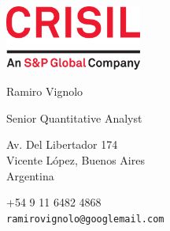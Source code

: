 \documentclass{article}
\begin{document}
\AddToShipoutPicture{\BackgroundPic}


\vspace{0.5cm plus \chico minus \chico}

\begin{minipage}{0.3\linewidth}




\end{minipage}
\begin{minipage}{0.4\linewidth}

\begin{center}
\href{http://www.crisil.com}{\includegraphics[width=4.5cm]{logos/crisil}}\\

\smallskip

\textsf{Ramiro Vignolo}
\par
\textsf{Senior Quantitative Analyst}\\

\medskip

Av. Del Libertador 174\\
Vicente López, Buenos Aires\\
Argentina
\end{center}


\begin{center}
+54 9 11 6482 4868\\
\textcolor{azul}{\texttt{ramirovignolo@googlemail.com}}\\


\end{center}
\end{minipage}
\end{document}
